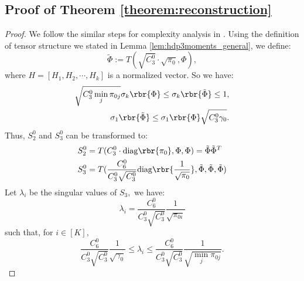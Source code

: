 \documentclass[twoside,11pt]{article}
\begin{document}
{\subsection{ Proof of Theorem \ref{theorem:reconstruction}}
\label{proof:reconstruction}

\begin{proof}
\label{proof:hdp3moments}
We follow the similar steps for complexity analysis in \cite{AnaFosHsuKakLiu12}.
Using the definition of tensor structure we stated in Lemma \ref{lem:hdp3moments_general}, we define:
\begin{equation}
	\tilde{\Phi} := T(\sqrt{C_3^{0}} \cdot \sqrt{\pi_0}, \Phi),
\end{equation}
where $H = [H_1, H_2, \cdots, H_k]$ is a normalized vector. So we have:
\begin{equation}
\begin{aligned}
	\sqrt{C_3^{0} \min_j \pi_{0j}} \sigma_k \rbr{\Phi} \leq \sigma_k \rbr{\tilde{\Phi}} \leq 1,\\
        \sigma_1 \rbr{\tilde{\Phi}} \leq \sigma_1 \rbr{\Phi}\sqrt{C_3^{0} \gamma_0}.
\end{aligned}
\end{equation}
Thus, $S_2^0$ and $S_3^0$ can be transformed to:
\begin{equation}
\begin{aligned}
	S_2^0 &= T( C_3^{0} \cdot \mathrm{diag}\rbr{\pi_0},\Phi,\Phi) = \tilde{\Phi}\tilde{\Phi}^T\\
	S_3^0 &= T( \frac{C_6^{0}}{C_3^{0}\sqrt{C_3^{0}}}  \mathrm{diag}\rbr{\frac{1}{\sqrt{\pi_0}}},\tilde{\Phi},\tilde{\Phi},\tilde{\Phi}) 
\end{aligned}
\end{equation}
Let $\lambda_i$ be the singular values of $S_3,$ we have:
\begin{equation}
	\lambda_i =  \frac{C_6^0}{C_3^0\sqrt{C_3^0}}\frac{1}{\sqrt{\pi_{0i}}}
\end{equation}
such that, for $i \in [K],$
 \begin{equation}
	 \frac{C_6^0}{C_3^0\sqrt{C_3^0}}\frac{1}{\sqrt{\gamma_0}} \leq \lambda_i \leq  \frac{C_6^0}{C_3^0\sqrt{C_3^0}}\frac{1}{\sqrt{\min_j \pi_{0j} }}.
\end{equation}


\end{proof}}
\end{document}
